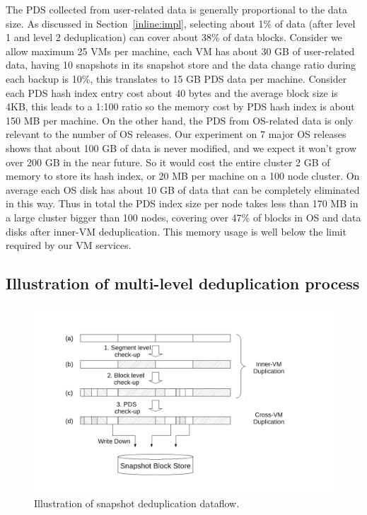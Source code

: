 The PDS collected from user-related data is generally proportional to the data size.
As discussed in Section~\ref{inline:impl}, selecting about 1\% of data (after level 1 and level 2 deduplication)
can cover about 38\% of data blocks. Consider we allow maximum 25 VMs per machine, each VM has
about 30 GB of user-related data, having 10 snapshots in its snapshot store and the data change ratio during
each backup is 10\%, this translates to 15 GB PDS data per machine. 
Consider each PDS hash index entry cost about 40 bytes and the average block size is 4KB, this leads to
a 1:100 ratio so the 
memory cost by PDS hash index is about 150 MB per machine.
On the other hand, the PDS from OS-related data is only relevant to the number of OS releases.
Our experiment on 7 major OS releases shows that about 100 GB of data is never modified, and we expect
it won't grow over 200 GB in the near future. So it would cost the entire cluster 2 GB of memory to
store its hash index, or 20 MB per machine on a 100 node cluster. On average each OS disk has about 10 GB
of data that can be completely eliminated in this way.
Thus in total the PDS index size per node takes less than 170 MB in a large cluster bigger than 100 nodes, 
covering over 47\% of blocks in OS and data disks after inner-VM deduplication.
This memory usage is well below the limit required by our VM services.

\subsection{Illustration of multi-level deduplication process}

%
\begin{figure}
  \centering
  \includegraphics[width=5in]{images/dedup_flow2.pdf}
  \caption{Illustration of snapshot deduplication dataflow.}
  \label{fig:dedupflow}
\end{figure}

